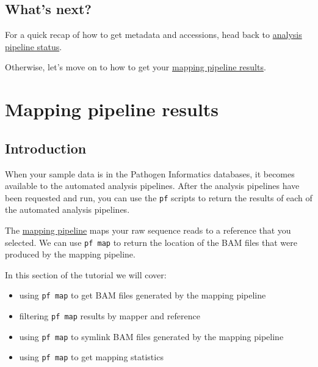 \documentclass[11pt]{article}
\providecommand{\tightlist}{%
      \setlength{\itemsep}{0pt}\setlength{\parskip}{0pt}}
\begin{document}
    \hypertarget{whats-next}{%
\subsection{What's next?}\label{whats-next}}

For a quick recap of how to get metadata and accessions, head back to
\href{pipeline-status.ipynb}{analysis pipeline status}.

Otherwise, let's move on to how to get your
\href{mapping-pipeline-results.ipynb}{mapping pipeline results}.





\newpage






    \hypertarget{mapping-pipeline-results}{%
\section{Mapping pipeline results}\label{mapping-pipeline-results}}

    \hypertarget{introduction}{%
\subsection{Introduction}\label{introduction}}

When your sample data is in the Pathogen Informatics databases, it
becomes available to the automated analysis pipelines. After the
analysis pipelines have been requested and run, you can use the
\texttt{pf} scripts to return the results of each of the automated
analysis pipelines.

The
\href{http://mediawiki.internal.sanger.ac.uk/index.php/Pathogen_Informatics_Mapping_Pipeline}{mapping
pipeline} maps your raw sequence reads to a reference that you selected.
We can use \texttt{pf\ map} to return the location of the BAM files that
were produced by the mapping pipeline.

In this section of the tutorial we will cover:

\begin{itemize}
\tightlist
\item
  using \texttt{pf\ map} to get BAM files generated by the mapping
  pipeline
\item
  filtering \texttt{pf\ map} results by mapper and reference
\item
  using \texttt{pf\ map} to symlink BAM files generated by the mapping
  pipeline
\item
  using \texttt{pf\ map} to get mapping statistics
\end{itemize}
\end{document}
